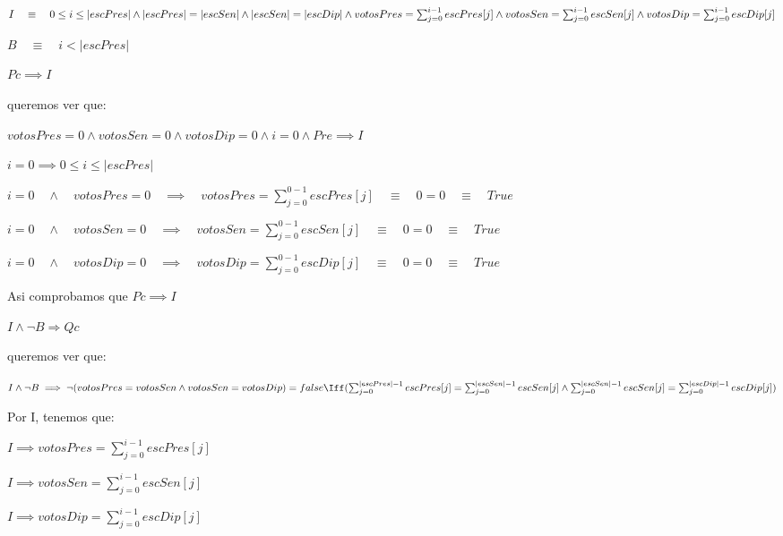 \documentclass[10pt,a4paper]{article}
\begin{document}
\vspace{0.3cm}
    $I \quad \equiv \quad 0 \leq i \leq |escPres| 
	\wedge |escPres| = |escSen|
    \wedge |escSen| = |escDip|
	\newline
    \wedge votosPres = \sum_{j=0}^{i - 1} escPres[j]
    \wedge votosSen =  \sum_{j=0}^{i - 1} escSen[j]
    \wedge votosDip =  \sum_{j=0}^{i - 1} escDip[j]$

\vspace{0.3cm}
    $B \quad \equiv \quad i < |escPres| $


\vspace{1.2cm}
    ${Pc} \implies  {I}$

	queremos ver que:

	$votosPres = 0 \wedge votosSen = 0 \wedge votosDip = 0 \wedge i=0 \wedge Pre \implies {I}$

$i=0 \implies 0 \leq i \leq |escPres|$

$i = 0 \quad \wedge \quad votosPres = 0 \quad \implies \quad votosPres = \sum_{j=0}^{0 - 1} escPres[j] \quad \equiv \quad 0 = 0 \quad \equiv \quad True$

$i = 0 \quad \wedge \quad votosSen = 0 \quad \implies \quad votosSen = \sum_{j=0}^{0 - 1} escSen[j] \quad \equiv \quad 0 = 0 \quad \equiv \quad True$

$i = 0 \quad \wedge \quad votosDip = 0 \quad \implies \quad votosDip = \sum_{j=0}^{0 - 1} escDip[j] \quad \equiv \quad 0 = 0 \quad \equiv \quad True$

\vspace{0.3cm}
Asi comprobamos que ${Pc} \implies  {I}$

\vspace{1.2cm}
    $ I \wedge \neg B  \Rightarrow Qc $
	
	queremos ver que:
	
	$ I \wedge \neg B \implies \neg(votosPres = votosSen \wedge votosSen = votosDip) = false \Iff 
	\newline
	( \sum_{j=0}^{|escPres| - 1} escPres[j] = \sum_{j=0}^{|escSen| - 1} escSen[j] \wedge \sum_{j=0}^{|escSen| - 1} escSen[j] = \sum_{j=0}^{|escDip| - 1} escDip[j] ) $


\vspace{0.6cm}
Por I, tenemos que: 

\vspace{0.3cm}
$I \implies votosPres = \sum_{j=0}^{i-1} escPres[j]$

$I \implies votosSen = \sum_{j=0}^{i-1} escSen[j]$

$I \implies votosDip =  \sum_{j=0}^{i-1} escDip[j]$
\end{document}
